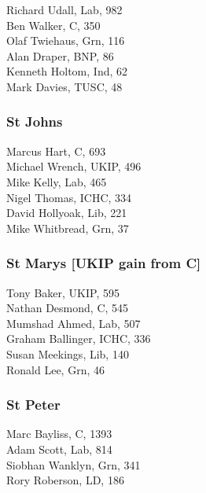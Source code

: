 \documentclass[a4paper,openany,10pt]{book}
\begin{document}


Richard Udall, Lab, 982\\
Ben Walker, C, 350\\
Olaf Twiehaus, Grn, 116\\
Alan Draper, BNP, 86\\
Kenneth Holtom, Ind, 62\\
Mark Davies, TUSC, 48\\


\subsubsection*{St Johns}



Marcus Hart, C, 693\\
Michael Wrench, UKIP, 496\\
Mike Kelly, Lab, 465\\
Nigel Thomas, ICHC, 334\\
David Hollyoak, Lib, 221\\
Mike Whitbread, Grn, 37\\


\subsubsection*{St Marys \hspace*{\fill}\nolinebreak[1]%
\enspace\hspace*{\fill}
[UKIP gain from C]}



Tony Baker, UKIP, 595\\
Nathan Desmond, C, 545\\
Mumshad Ahmed, Lab, 507\\
Graham Ballinger, ICHC, 336\\
Susan Meekings, Lib, 140\\
Ronald Lee, Grn, 46\\


\subsubsection*{St Peter}



Marc Bayliss, C, 1393\\
Adam Scott, Lab, 814\\
Siobhan Wanklyn, Grn, 341\\
Rory Roberson, LD, 186\\
\end{document}
